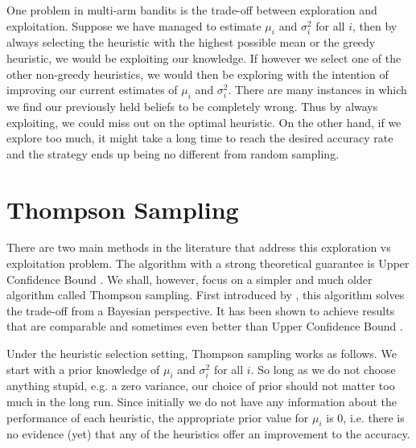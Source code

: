 One problem in multi-arm bandits is the trade-off between exploration and exploitation. Suppose we
have managed to estimate $\mu_i$ and $\sigma_i^2$ for all $i$, then by always selecting the
heuristic with the highest possible mean or the greedy heuristic, we would be exploiting our
knowledge. If however we select one of the other non-greedy heuristics, we would then be exploring
with the intention of improving our current estimates of $\mu_i$ and $\sigma_i^2$. There are many
instances in which we find our previously held beliefs to be completely wrong. Thus by always
exploiting, we could miss out on the optimal heuristic. On the other hand, if we explore too much,
it might take a long time to reach the desired accuracy rate and the strategy ends up being no
different from random sampling.

\section{Thompson Sampling}
\label{sec:thompson}

There are two main methods in the literature that address this exploration vs exploitation problem.
The algorithm with a strong theoretical guarantee is Upper Confidence Bound \cite{auer02}. We
shall, however, focus on a simpler and much older algorithm called Thompson sampling. First
introduced by , this algorithm solves the trade-off from a Bayesian perspective.
It has been shown to achieve results that are comparable and sometimes even better than Upper
Confidence Bound \cite{chapelle11}.

Under the heuristic selection setting, Thompson sampling works as follows. We start with a prior
knowledge of $\mu_i$ and $\sigma_i^2$ for all $i$. So long as we do not choose anything stupid, e.g. a zero
variance, our choice of prior should not matter too much in the long run. Since initially
we do not have any information about the performance of each heuristic, the appropriate prior value
for $\mu_i$ is $0$, i.e. there is no evidence (yet) that any of the heuristics offer an
improvement to the accuracy.

